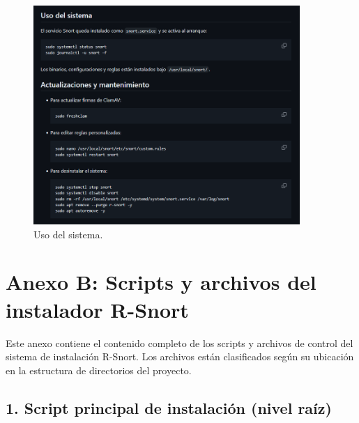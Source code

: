 \documentclass[11pt,a4paper,twoside]{report}
\begin{document}
\begin{figure}[H]
	\centering
	\includegraphics[width=0.9\textwidth]{github/5.png}
	\caption{Uso del sistema.}
\end{figure}

\FloatBarrier

\chapter{Anexo B: Scripts y archivos del instalador R-Snort}
\label{anexo_scripts}

Este anexo contiene el contenido completo de los scripts y archivos de control del sistema de instalación R-Snort. Los archivos están clasificados según su ubicación en la estructura de directorios del proyecto.

\section*{1. Script principal de instalación (nivel raíz)}
\end{document}
